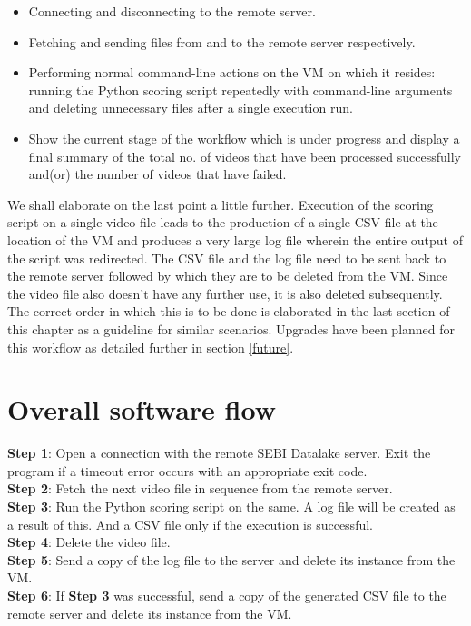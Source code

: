 \begin{itemize}
  \item Connecting and disconnecting to the remote server.
  \item Fetching and sending files from and to the remote server respectively.
  \item Performing normal command-line actions on the VM on which it resides: running the Python scoring script repeatedly with command-line arguments and deleting unnecessary files after a single execution run.
  \item Show the current stage of the workflow which is under progress and display a final summary of the total no. of videos that have been processed successfully and(or) the number of videos that have failed.

\end{itemize}

We shall elaborate on the last point a little further. Execution of the scoring script on a single video file leads to the production of a single CSV file at the location of the VM and produces a very large log file wherein the entire output of the script was redirected. The CSV file and the log file need to be sent back to the remote server followed by which they are to be deleted from the VM. Since the video file also doesn’t have any further use, it is also deleted subsequently. The correct order in which this is to be done is elaborated in the last section of this chapter as a guideline for similar scenarios. Upgrades have been planned for this workflow as detailed further in section \ref{future}.


\section{Overall software flow}

\textbf{Step 1}: Open a connection with the remote SEBI Datalake server. Exit the program if a timeout error occurs with an appropriate exit code. \\[5mm]
\textbf{Step 2}: Fetch the next video file in sequence from the remote server. \\[5mm]
\textbf{Step 3}: Run the Python scoring script on the same. A log file will be created as a result of this. And a CSV file only if the execution is successful. \\[5mm]
\textbf{Step 4}: Delete the video file. \\[5mm]
\textbf{Step 5}: Send a copy of the log file to the server and delete its instance from the VM. \\[5mm]
\textbf{Step 6}: If \textbf{Step 3} was successful, send a copy of the generated CSV file to the remote server and delete its instance from the VM.



